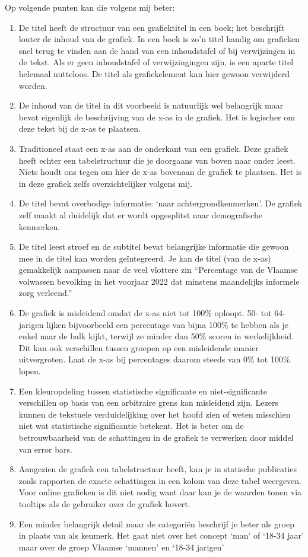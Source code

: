 \documentclass{SVnote}
\begin{document}
Op volgende punten kan die volgens mij beter:
\begin{enumerate}
\item De titel heeft de structuur van een grafiektitel in een boek; het beschrijft louter de inhoud van de grafiek. In een boek is zo'n titel handig om grafieken snel terug te vinden aan de hand van een inhoudstafel of bij verwijzingen in de tekst. Als er geen inhoudstafel of verwijzingingen zijn, is een aparte titel helemaal nutteloos. De titel als grafiekelement kan hier gewoon verwijderd worden.
\item De inhoud van de titel in dit voorbeeld is natuurlijk wel belangrijk maar bevat eigenlijk de beschrijving van de x-as in de grafiek. Het is logischer om deze tekst bij de x-as te plaatsen.
\item Traditioneel staat een x-as aan de onderkant van een grafiek. Deze grafiek heeft echter een tabelstructuur die je doorgaans van boven naar onder leest. Niets houdt ons tegen om hier de x-as bovenaan de grafiek te plaatsen. Het is in deze grafiek zelfs overzichtelijker volgens mij.
\item De titel bevat overbodige informatie: `naar achtergrondkenmerken'. De grafiek zelf maakt al duidelijk dat er wordt opgesplitst naar demografische kenmerken.
\item De titel leest stroef en de subtitel bevat belangrijke informatie die gewoon mee in de titel kan worden geïntegreerd. Je kan de titel (van de x-as) gemakkelijk aanpassen naar de veel vlottere zin ``Percentage van de Vlaamse volwassen bevolking in het voorjaar 2022 dat minstens maandelijks informele zorg verleend.''
\item De grafiek is misleidend omdat de x-as niet tot 100\% oploopt. 50- tot 64-jarigen lijken bijvoorbeeld een percentage van bijna 100\% te hebben als je enkel naar de balk kijkt, terwijl ze minder dan 50\% scoren in werkelijkheid. Dit kan ook verschillen tussen groepen op een misleidende manier uitvergroten. Laat de x-as bij percentages daarom steeds van 0\% tot 100\% lopen.  
\item Een kleuropdeling tussen statistische significante en niet-significante verschillen op basis van een arbitraire grens kan misleidend zijn. Lezers kunnen de tekstuele verduidelijking over het hoofd zien of weten misschien niet wat statistische significantie betekent. Het is beter om de betrouwbaarheid van de schattingen in de grafiek te verwerken door middel van error bars.
\item Aangezien de grafiek een tabelstructuur heeft, kan je in statische publicaties zoals rapporten de exacte schattingen in een kolom van deze tabel weergeven. Voor online grafieken is dit niet nodig want daar kan je de waarden tonen via tooltips als de gebruiker over de grafiek hovert.
\item Een minder belangrijk detail maar de categoriën beschrijf je beter als groep in plaats van als kenmerk. Het gaat niet over het concept `man' of `18-34 jaar' maar over de groep Vlaamse `mannen' en `18-34 jarigen'
\end{enumerate}
\end{document}
